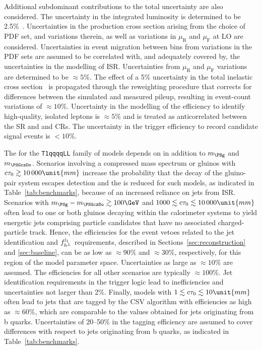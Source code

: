 Additional subdominant contributions to the total uncertainty are also
considered. The uncertainty in the integrated luminosity is determined
to be 2.5\%~\cite{CMS:2017sdi}. Uncertainties in the production cross
section arising from the choice of PDF set, and variations therein, as
well as variations in $\mu_\text{R}$ and $\mu_\text{F}$ at LO are
considered. Uncertainties in event migration between bins from
variations in the PDF sets are assumed to be correlated with, and
adequately covered by, the uncertainties in the modelling of
ISR. Uncertainties from $\mu_\text{R}$ and $\mu_\text{F}$ variations
are determined to be ${\approx}5\%$. The effect of a 5\% uncertainty
in the total inelastic cross section~\cite{Aaboud:2016mmw} is
propagated through the reweighting procedure that corrects for
differences between the simulated and measured pileup, resulting in
event-count variations of ${\approx}10\%$. Uncertainty in the
modelling of the efficiency to identify high-quality, isolated leptons
is ${\approx}5\%$ and is treated as anticorrelated between the SR and
\mj and \mmj CRs. The uncertainty in the trigger efficiency to record
candidate signal events is ${<}10\%$.

The \ate for the \texttt{T1qqqqLL} family of models depends on \ctau
in addition to $m_\PSg$ and $m_{\PSGczDo}$. Scenarios involving a
compressed mass spectrum or gluinos with $\ctau \gtrsim
10\,000\unit{mm}$ increase the probability that the decay of the
gluino-pair system escapes detection and the \ate is reduced for such
models, as indicated in Table~\ref{tab:benchmarks}, because of an
increased reliance on jets from ISR. Scenarios with $m_\PSg -
m_{\PSGczDo} \gtrsim 100\GeV$ and $1000 \lesssim \ctau \lesssim
10\,000\unit{mm}$ often lead to one or both gluinos decaying within
the calorimeter systems to yield energetic jets comprising particle
candidates that have no associated charged-particle track. Hence, the
efficiencies for the event vetoes related to the jet identification
and $f_{h^{\pm}}^{\jet{1}}$ requirements, described in
Sections~\ref{sec:reconstruction} and \ref{sec:baseline}, can be as
low as ${\approx}90\%$ and ${\approx}30\%$, respectively, for this
region of the model parameter space. Uncertainties as large as
${\approx}10\%$ are assumed. %
The efficiencies %
for all other scenarios are typically ${\approx}100\%$. Jet
identification requirements in the trigger logic lead to
inefficiencies and uncertainties not larger than 2\%. Finally, models
with $1 \lesssim \ctau \lesssim 10\unit{mm}$ often lead to jets that
are tagged by the CSV algorithm with efficiencies as high as
${\approx}60\%$, which are comparable to the values obtained for jets
originating from b quarks. Uncertainties of 20--50\% in the tagging
efficiency are assumed to cover differences with respect to jets
originating from b quarks, as indicated in
Table~\ref{tab:benchmarks}. 

